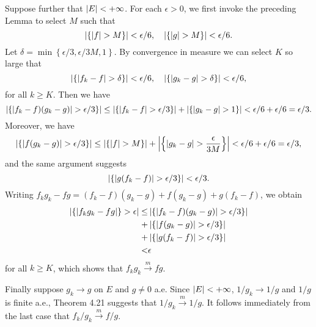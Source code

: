 \begin{exercise}{4.17}
  Suppose further that $\left\vert E\right\vert < +\infty$.
  For each $\epsilon > 0$,
  we first invoke the preceding Lemma to select $M$ such that
  \[
    \left\vert\left\{ \lvert f \rvert > M \right\}\right\vert < \epsilon/6, \quad
    \left\vert\left\{ \lvert g \rvert > M \right\}\right\vert < \epsilon/6.
  \]
  Let $\delta = \min\left\{ \epsilon/3, \epsilon/3M, 1 \right\}$.
  By convergence in measure we can select $K$ so large that
  \[
    \left\vert\left\{ \lvert f_k - f \rvert > \delta \right\}\right\vert < \epsilon/6, \quad
    \left\vert\left\{ \lvert g_k - g \rvert > \delta \right\}\right\vert < \epsilon/6,
  \]
  for all $k \ge K$.
  Then we have
  \[
    \left\vert\left\{ \lvert f_k - f)(g_k - g) \rvert > \epsilon/3 \right\} \right\vert
    \le \left\vert\left\{ \lvert f_k - f \rvert > \epsilon/3 \right\}\right\vert
    + \left\vert\left\{ \lvert g_k - g \rvert > 1 \right\}\right\vert
    < \epsilon/6 + \epsilon/6 = \epsilon/3.
  \]
  Moreover, we have
  \[
    \left\vert\left\{ \lvert f (g_k - g) \rvert > \epsilon/3 \right\}\right\vert
    \le \left\vert\left\{ \lvert f \rvert > M \right\}\right\vert
    + \left\vert\left\{ \lvert g_k - g \rvert > \frac{\epsilon}{3M} \right\}\right\vert
    < \epsilon/6 + \epsilon/6 = \epsilon/3,
  \]
  and the same argument suggests
  \[
    \left\vert\left\{ \lvert g (f_k - f) \rvert > \epsilon/3 \right\}\right\vert < \epsilon/3.
  \]
  Writing $f_k g_k - fg = (f_k - f)(g_k - g) + f(g_k - g) + g(f_k - f)$,
  we obtain
  \[
    \begin{aligned}
      \left\vert\left\{ \lvert f_k g_k - fg \rvert \right\} > \epsilon\right\vert
      \le &\left\vert\left\{ \lvert f_k - f)(g_k - g) \rvert > \epsilon/3 \right\} \right\vert \\
      + &\left\vert\left\{ \lvert f (g_k - g) \rvert > \epsilon/3 \right\}\right\vert \\
      + &\left\vert\left\{ \lvert g (f_k - f) \rvert > \epsilon/3 \right\}\right\vert \\
      < &\epsilon
    \end{aligned}
  \]
  for all $k \ge K$, which shows that $f_k g_k \xrightarrow{m} fg$.

  Finally suppose $g_k \rightarrow g$ on $E$ and $g \neq 0$ a.e.
  Since $\left\vert E\right\vert < +\infty$, $1/g_k \rightarrow 1/g$ and $1/g$ is finite a.e.,
  Theorem 4.21 suggests that $1/g_k \xrightarrow{m} 1/g$.
  It follows immediately from the last case that $f_k/g_k \xrightarrow{m} f/g$.
\end{exercise}

